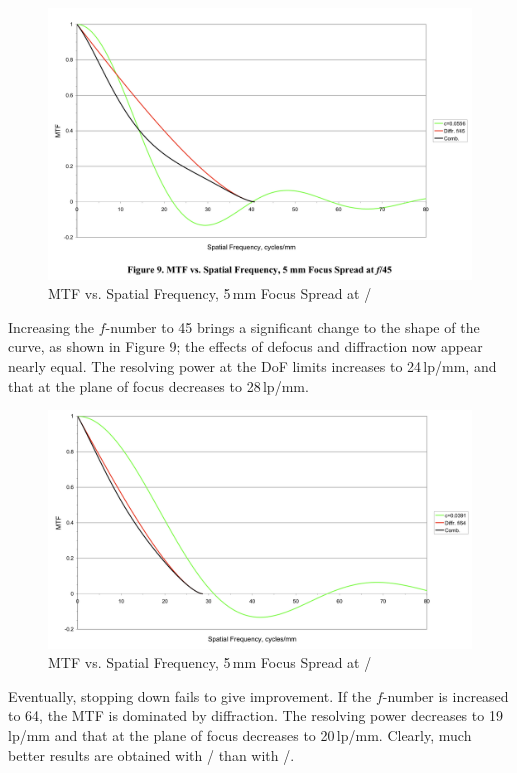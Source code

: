 \documentclass[11pt, oneside]{scrartcl}   	%
\newcommand{\f}[1]{\mbox{\raisebox{2pt}{\footnotesize $f$\hspace{-1.2pt}}/\hspace{-0.6pt}\raisebox{-0.6pt}{\small #1}}}
\begin{document}
\begin{figure}[htbp] %
   \centering
   \includegraphics[width=\linewidth]{figure/fig_dofd_9} 
   \caption{MTF vs. Spatial Frequency, 5\,mm Focus Spread at \f{45}}
   \label{fig:MTFvssf45}
\end{figure}
Increasing the $f$-number to 45 brings a significant change to the shape of the curve, as shown in Figure 9; the effects of defocus and diffraction now appear nearly equal. The resolving power at the DoF limits increases to 24\,lp/mm, and that at the plane of focus decreases to 28\,lp/mm.

\begin{figure}[htbp] %
   \centering
   \includegraphics[width=\linewidth]{figure/fig_dofd_10} 
   \caption{MTF vs. Spatial Frequency, 5\,mm Focus Spread at \f{64}}
   \label{fig:MTFvssf64}
\end{figure}
Eventually, stopping down fails to give improvement. If the $f$-number is increased to 64, the
MTF is dominated by diffraction. The resolving power decreases to 19\,lp/mm and that at the 
plane of focus decreases to 20\,lp/mm. Clearly, much better results are obtained with \f{45} than with \f{64}.
\end{document}
